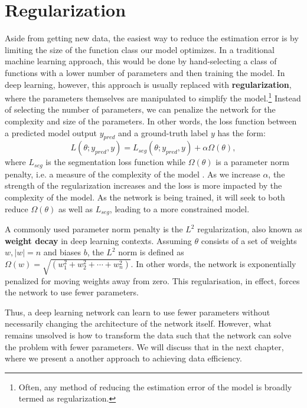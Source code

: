 \section{Regularization}

Aside from getting new data, the easiest way to reduce the estimation error is by limiting the size of the function class our model optimizes. In a traditional machine learning approach, this would be done by hand-selecting a class of functions with a lower number of parameters and then training the model. In deep learning, however, this approach is usually replaced with \textbf{regularization}, where the parameters themselves are manipulated to simplify the model.\footnote{Often, any method of reducing the estimation error of the model is broadly termed as regularization.} Instead of selecting the number of parameters, we can penalize the network for the complexity and size of the parameters. In other words, the loss function between a predicted model output $y_{pred}$ and a ground-truth label $y$ has the form:
\begin{equation}
	L(\theta; y_{pred}, y) = L_{seg}(\theta; y_{pred}, y) + \alpha\Omega(\theta),
\end{equation}
where $L_{seg}$ is the segmentation loss function while $\Omega(\theta)$ is a parameter norm penalty, i.e. a measure of the complexity of the model \cite{goodfellowDeepLearning2016}. As we increase $\alpha$, the strength of the regularization increases and the loss is more impacted by the complexity of the model. As the network is being trained, it will seek to both reduce $\Omega(\theta)$ as well as $L_{seg}$, leading to a more constrained model.

A commonly used parameter norm penalty is the $L^2$ regularization, also known as \textbf{weight decay} in deep learning contexts. Assuming $\theta$ consists of a set of weights $w, \lvert w \rvert = n$ and biases $b$, the $L^2$ norm is defined as $\Omega(w) = \sqrt{(w_1^2 + w_2^2 + \cdots + w_n^2)}$. In other words, the network is exponentially penalized for moving weights away from zero. This regularisation, in effect, forces the network to use fewer parameters.

Thus, a deep learning network can learn to use fewer parameters without necessarily changing the architecture of the network itself. However, what remains unsolved is how to transform the data such that the network can solve the problem with fewer parameters. We will discuss that in the next chapter, where we present a another approach to achieving data efficiency.

